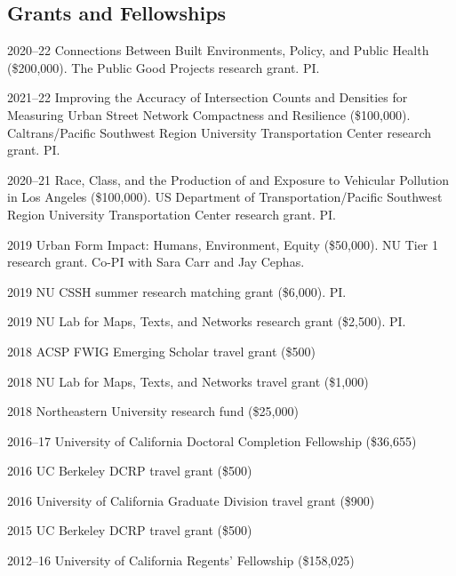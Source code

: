 \documentclass[12pt,letterpaper]{report}
\begin{document}
    \subsection*{Grants and Fellowships}

    \begin{tablist}

        \item[2020--22] \tab{}Connections Between Built Environments, Policy, and Public Health (\$200,000). The Public Good Projects research grant. PI.\@

        \item[2021--22] \tab{}Improving the Accuracy of Intersection Counts and Densities for Measuring Urban Street Network Compactness and Resilience (\$100,000). Caltrans/Pacific Southwest Region University Transportation Center research grant. PI.\@

        \item[2020--21] \tab{}Race, Class, and the Production of and Exposure to Vehicular Pollution in Los Angeles (\$100,000). US Department of Transportation/Pacific Southwest Region University Transportation Center research grant. PI.\@

        \item[2019] \tab{}Urban Form Impact: Humans, Environment, Equity (\$50,000). NU Tier 1 research grant. Co-PI with Sara Carr and Jay Cephas.

        \item[2019] \tab{}NU CSSH summer research matching grant (\$6,000). PI.\@

        \item[2019] \tab{}NU Lab for Maps, Texts, and Networks research grant (\$2,500). PI.\@

        \item[2018] \tab{}ACSP FWIG Emerging Scholar travel grant (\$500)

        \item[2018] \tab{}NU Lab for Maps, Texts, and Networks travel grant (\$1,000)

        \item[2018] \tab{}Northeastern University research fund (\$25,000)

        \item[2016--17] \tab{}University of California Doctoral Completion Fellowship (\$36,655)

        \item[2016] \tab{}UC Berkeley DCRP travel grant (\$500)

        \item[2016] \tab{}University of California Graduate Division travel grant (\$900)

        \item[2015] \tab{}UC Berkeley DCRP travel grant (\$500)

        \item[2012--16] \tab{}University of California Regents' Fellowship (\$158,025)

    \end{tablist}
\end{document}
